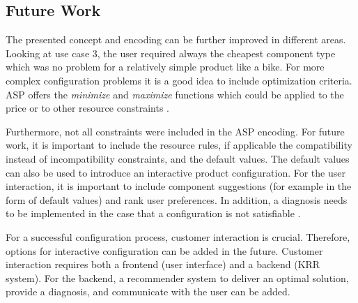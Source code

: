 \subsection{Future Work}
The presented concept and encoding can be further improved in different areas. Looking at use case 3, the user required always the cheapest component type which was no problem for a relatively simple product like a bike. For more complex configuration problems it is a good idea to include optimization criteria. ASP offers the \textit{minimize} and \textit{maximize} functions which could be applied to the price or to other resource constraints \cite{gekakasc11d}. \newline

Furthermore, not all constraints were included in the ASP encoding. For future work, it is important to include the resource rules, if applicable the compatibility instead of incompatibility constraints, and the default values. The default values can also be used to introduce an interactive product configuration. For the user interaction, it is important to include component suggestions (for example in the form of default values) and rank user preferences. In addition, a diagnosis needs to be implemented in the case that a configuration is not satisfiable \cite{syrjanen00a}. \newline

For a successful configuration process, customer interaction is crucial. Therefore, options for interactive configuration can be added in the future. Customer interaction requires both a frontend (user interface) and a backend (KRR system). For the backend, a recommender system 
to deliver an optimal solution, provide a diagnosis, and communicate with the user \cite{fahakrscscta20a} can be added. 

